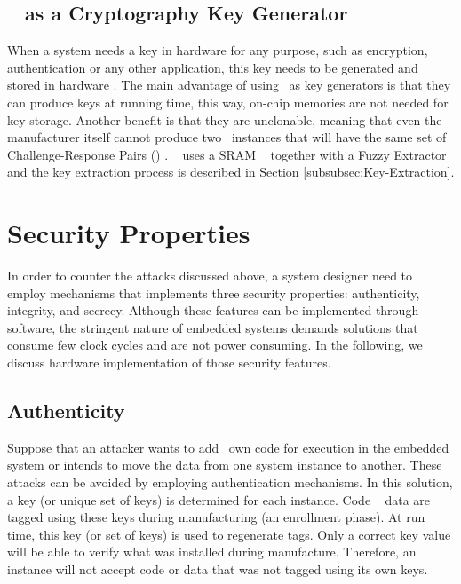 \subsection{\puf~ as a Cryptography  Key Generator }
When a system needs a key in hardware for any purpose, such as encryption, authentication or any other application, this key needs to be generated  and stored in hardware \cite{puf-key-devadas-1278484}. The main advantage of using \pufs~as key generators is that they can produce keys at running time, this way, on-chip memories are not needed for key storage. Another benefit is that they are unclonable, meaning that even the manufacturer itself cannot produce two \puf~instances that will have the same set of Challenge-Response Pairs (\crps) \cite{Gassend2002:PUFs}.
\cshia~ uses a SRAM \puf~ together with a Fuzzy Extractor and the key extraction process is described in Section \ref{subsubsec:Key-Extraction}.


\section{Security Properties}
\label{sec:securityproperties}
In order to counter the attacks discussed above, a system designer need to employ mechanisms that implements three security properties: authenticity, integrity, and secrecy. Although these features can be implemented through software, the stringent nature of embedded systems demands solutions that consume few clock cycles and are not power consuming.
In the following, we discuss hardware implementation of those security features.

\subsection{Authenticity}
\label{subsec:Authenticity}
Suppose that an attacker wants to add \hisher~own code for execution in the embedded system or intends to move the data from one system instance to another. These attacks can be avoided by employing authentication mechanisms. In this solution, a key (or unique set of keys) is determined for each instance.
Code \andor~ data are tagged using these keys during manufacturing (an enrollment phase). At run time, this key (or set of keys) is used to regenerate tags. Only a correct key value will be able to verify what was installed during manufacture. Therefore, an instance will not accept code or data that was not tagged using its own keys.

